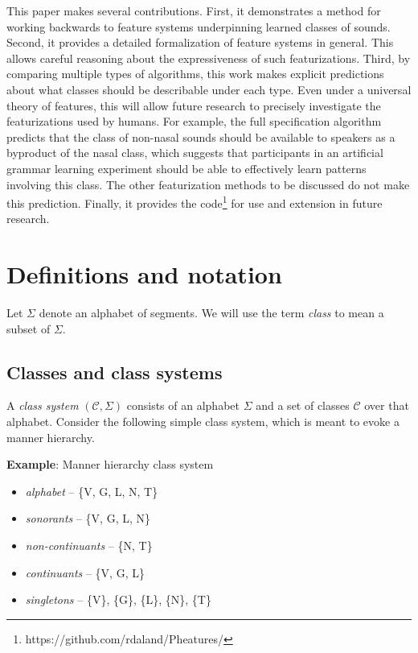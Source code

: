 \documentclass[11pt, oneside]{article}   	%
\begin{document}
This paper makes several contributions. First, it demonstrates a method for working backwards to feature systems underpinning learned classes of sounds. Second, it provides a detailed formalization of feature systems in general. This allows careful reasoning about the expressiveness of such featurizations. Third, by comparing multiple types of algorithms, this work makes explicit predictions about what classes should be describable under each type. Even under a universal theory of features, this will allow future research to precisely investigate the featurizations used by humans. For example, the full specification algorithm predicts that the class of non-nasal sounds should be available to speakers as a byproduct of the nasal class, which suggests that participants in an artificial grammar learning experiment should be able to effectively learn patterns involving this class. The other featurization methods to be discussed do not make this prediction. Finally, it provides the code\footnote{https://github.com/rdaland/Pheatures/} for use and extension in future research. 

\FloatBarrier
\section{Definitions and notation}
\label{sec:definitions}
Let $\Sigma$ denote an alphabet of segments. We will use the term \textit{class} to mean a subset of $\Sigma$.

\subsection{Classes and class systems}

A \textit{class system} $(\mathcal C, \Sigma)$ consists of an alphabet $\Sigma$ and a set of classes $\mathcal C$ over that alphabet. Consider the following simple class system, which is meant to evoke a manner hierarchy.

\vspace{\baselineskip} \noindent \textbf{Example}: Manner hierarchy class system \begin{itemize}
  \item \textit{alphabet} -- \{V, G, L, N, T\}
  \item \textit{sonorants} -- \{V, G, L, N\}
  \item \textit{non-continuants} -- \{N, T\}
  \item \textit{continuants} -- \{V, G, L\}
  \item \textit{singletons} -- \{V\}, \{G\}, \{L\}, \{N\}, \{T\}
  \end{itemize}
\end{document}

